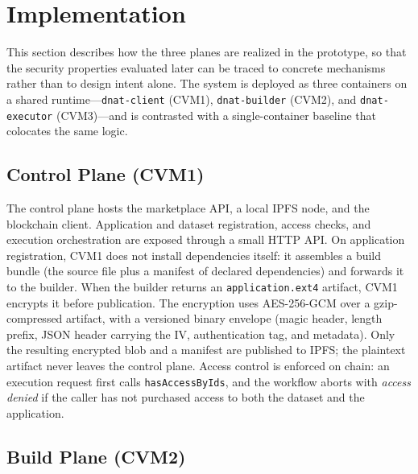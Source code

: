 
\section{Implementation}
\label{sec:implementation}

This section describes how the three planes are realized in the prototype, so
that the security properties evaluated later can be traced to concrete mechanisms
rather than to design intent alone. The system is deployed as three containers on
a shared runtime---\texttt{dnat-client} (CVM1), \texttt{dnat-builder} (CVM2), and
\texttt{dnat-executor} (CVM3)---and is contrasted with a single-container
baseline that colocates the same logic.

\subsection{Control Plane (CVM1)}

The control plane hosts the marketplace API, a local IPFS node, and the
blockchain client. Application and dataset registration, access checks, and
execution orchestration are exposed through a small HTTP API. On application
registration, CVM1 does not install dependencies itself: it assembles a build
bundle (the source file plus a manifest of declared dependencies) and forwards it
to the builder. When the builder returns an \texttt{application.ext4} artifact,
CVM1 encrypts it before publication. The encryption uses AES-256-GCM over a
gzip-compressed artifact, with a versioned binary envelope (magic header, length
prefix, JSON header carrying the IV, authentication tag, and metadata). Only the
resulting encrypted blob and a manifest are published to IPFS; the plaintext
artifact never leaves the control plane. Access control is enforced on chain: an
execution request first calls \texttt{hasAccessByIds}, and the workflow aborts
with \emph{access denied} if the caller has not purchased access to both the
dataset and the application.

\subsection{Build Plane (CVM2)}

